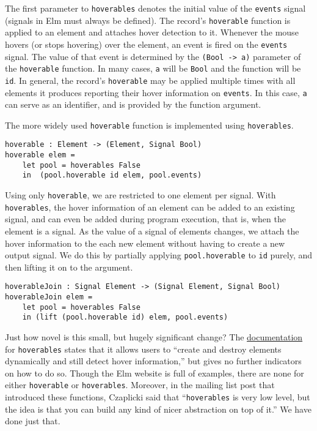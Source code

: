 \documentclass{article}
\begin{document}
The first parameter to \texttt{hoverables} denotes the initial value of the
\texttt{events} signal (signals in Elm must always be defined). The record's
\texttt{hoverable} function is applied to an element and attaches hover
detection to it. Whenever the mouse hovers (or stops hovering) over the element,
an event is fired on the \texttt{events} signal. The value of that event is
determined by the \texttt{(Bool -> a)} parameter of the \texttt{hoverable}
function. In many cases, \texttt{a} will be \texttt{Bool} and the function will
be \texttt{id}. In general, the record's \texttt{hoverable} may be applied
multiple times with all elements it produces reporting their hover information
on \texttt{events}. In this case, \texttt{a} can serve as an identifier, and is
provided by the function argument.

The more widely used \texttt{hoverable} function is implemented using
\texttt{hoverables}.

\begin{verbatim}
hoverable : Element -> (Element, Signal Bool)
hoverable elem =
    let pool = hoverables False
    in  (pool.hoverable id elem, pool.events)
\end{verbatim}

Using only \texttt{hoverable}, we are restricted to one element per signal. With
\texttt{hoverables}, the hover information of an element can be added to an
existing signal, and can even be added during program execution, that is, when
the element is a signal. As the value of a signal of elements changes, we attach
the hover information to the each new element without having to create a new
output signal. We do this by partially applying \texttt{pool.hoverable} to
\texttt{id} purely, and then lifting it on to the argument.

\begin{verbatim}
hoverableJoin : Signal Element -> (Signal Element, Signal Bool)
hoverableJoin elem =
    let pool = hoverables False
    in (lift (pool.hoverable id) elem, pool.events)
\end{verbatim}

Just how novel is this small, but hugely significant change? The
\href{http://docs.elm-lang.org/library/Graphics/Input.elm\#hoverables}{documentation}
for \texttt{hoverables} states that it allows users to ``create and destroy
elements dynamically and still detect hover information,'' but gives no further
indicators on how to do so. Though the Elm website is full of examples, there
are none for either \texttt{hoverable} or \texttt{hoverables}. Moreover, in the
mailing list post that introduced these functions, Czaplicki said that
``\texttt{hoverables} is very low level, but the idea is that you can build any
kind of nicer abstraction on top of it.'' \cite{hover-forum} We have done just
that.
\end{document}
